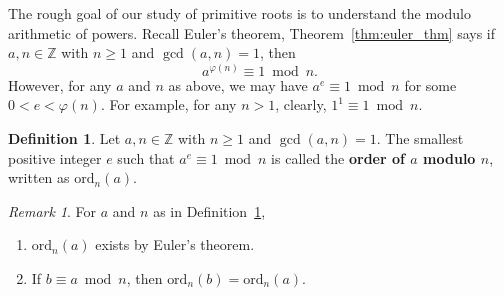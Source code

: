 \documentclass{amsbook}
\theoremstyle{plain}
\theoremstyle{definition}
\newtheorem{definition}[theorem]{Definition}
\theoremstyle{remark}
\newtheorem{remark}[theorem]{Remark}
\numberwithin{equation}{chapter}
\numberwithin{figure}{chapter}
\newcommand{\Z}{\mathbb{Z}}
\begin{document}
The rough goal of our study of primitive roots is to understand the modulo arithmetic of powers. Recall Euler's theorem, Theorem~\ref{thm:euler_thm} says if $a, n \in \Z$ with $n \geqslant 1$ and $\gcd (a,n) = 1$, then
\[
  a^{\varphi (n)} \equiv 1 \bmod n.
\]
However, for any $a$ and $n$ as above, we may have $a^e \equiv 1 \bmod n$ for some $0 < e < \varphi (n)$. For example, for any $n > 1$, clearly, $1^1 \equiv 1 \bmod n$.
\begin{definition}\label{def:order_mod_n}
  Let $a, n \in \Z$ with $n \geqslant 1$ and $\gcd (a, n) = 1$. The smallest positive integer $e$ such that $a^e \equiv 1 \bmod n$ is called the \textbf{order of $a$ modulo $n$}, written as $\text{ord}_n (a)$.
\end{definition}
\begin{remark}\label{rmk:ord_cong}
  For $a$ and $n$ as in Definition~\ref{def:order_mod_n},
  \begin{enumerate}[label=(\roman*)]
  \item $\text{ord}_n (a)$ exists by Euler's theorem.
  \item If $b \equiv a \bmod n$, then $\text{ord}_n (b) = \text{ord}_n (a)$.\label{itm:itm1_day26}
  \end{enumerate}
\end{remark}
\end{document}
